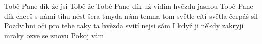 \begin{TEXT}{Tobě Pane dík}
\REFREN  {}   že  jsi   \NL
Tobě   že    \NL
Tobě Pane dík už vidím hvězdu jasnou \NL
Tobě Pane dík chceš s námi tíhu nést 
\SLOKA {} šera  tmyda nám  \NL
{} temna    \NL
{} tom světle   cítí \NL
{}světla čerpáš  sil 
\SLOKA Pozdvihni oči pro tebe taky \NL
ta hvězda svítí nejsi sám \NL
I když ji někdy zakryjí mraky \NL
ozve se znovu Pokoj vám \NL
\end{TEXT}
